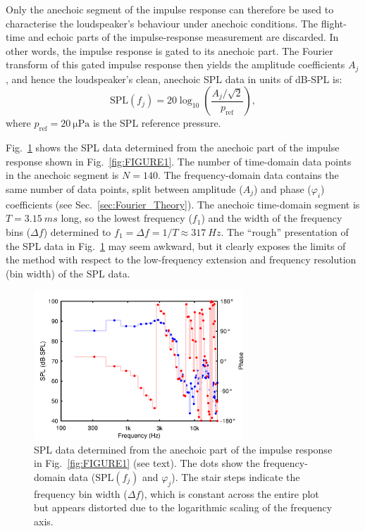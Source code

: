 \documentclass[12pt,a4paper]{article}
\providecommand{\secn}[1]{Sec.~\ref{sec:#1}}
\providecommand{\figlabel}[1]{\label{fig:#1}}
\providecommand{\figr}[1]{Fig.~\ref{fig:#1}}
\providecommand{\pRef}{p_\mathrm{ref}}
\begin{document}
Only the anechoic segment of the impulse response can therefore be used to characterise the loudspeaker’s behaviour under anechoic conditions. The flight-time and echoic parts of the impulse-response measurement are discarded. In other words, the impulse response is gated to its anechoic part. The Fourier transform of this gated impulse response then yields the amplitude coefficients $A_j$, and hence the loudspeaker’s clean, anechoic SPL data in units of dB-SPL is:
\[
\mathrm{SPL}(f_j) = 20 \log_{10}\left( \frac{A_j / \sqrt{2}}{\pRef} \right),
\]
where $\pRef = \SI{20}{\micro\pascal}$ is the SPL reference pressure.

\figr{FIGURE2} shows the SPL data determined from the anechoic part of the impulse response shown in \figr{FIGURE1}. The number of time-domain data points in the anechoic segment is $N = 140$. The frequency-domain data contains the same number of data points, split between amplitude ($A_j$) and phase ($\varphi_i$) coefficients (see \secn{Fourier_Theory}). The anechoic time-domain segment is $T = \SI{3.15}{ms}$ long, so the lowest frequency ($f_1$) and the width of the frequency bins ($\Delta f$) determined to $f_1 = \Delta f = 1/T \approx \SI{317}{Hz}$. The ``rough'' presentation of the SPL data in \figr{FIGURE2} may seem awkward, but it clearly exposes the limits of the method with respect to the low-frequency extension and frequency resolution (bin width) of the SPL data.

\begin{figure}[tbp]
  \begin{center}
    \includegraphics[width=0.7\textwidth]{FIGURE2}
    \caption{SPL data determined from the anechoic part of the impulse response in \figr{FIGURE1} (see text). The dots show the frequency-domain data ($\mathrm{SPL}(f_j)$ and $\varphi_j$). The stair steps indicate the frequency bin width ($\Delta f$), which is constant across the entire plot but appears distorted due to the logarithmic scaling of the frequency axis.}
    \figlabel{FIGURE2}
  \end{center}
\end{figure}
\end{document}
